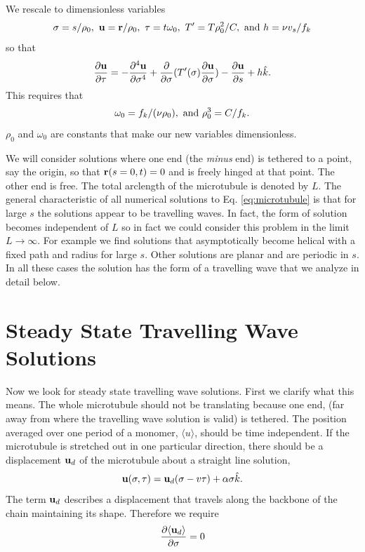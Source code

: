 \documentclass[11pt]{ucthesis}
\def\br{{\bf r}}
\def\bu{{\bf u}}
\begin{document}
{We rescale to dimensionless variables 
\begin{equation}
\label{eq:rescale}
\sigma = s/\rho_0,~ \bu = \br/\rho_0, ~ \tau = t \omega_0,  ~ T' = T \rho_0^2/C, ~{\rm and} ~ h = \nu v_s/f_k 
\end{equation}
so that
\begin{equation}
\label{eq:dimensionless}
\frac{\partial \bu}{\partial \tau} =  - \frac{\partial^4 \bu}{\partial \sigma^4} + \frac{\partial}{\partial \sigma}(T'(\sigma)\frac{\partial \bu}{\partial \sigma}) -
\frac{\partial \bu}{\partial s} + h {\hat k} .
\end{equation}
This requires that 
\begin{equation}
\label{eq:scaling}
\omega_0 = f_k/(\nu \rho_0), ~  {\rm and} ~ \rho_0^3 = C/f_k. 
\end{equation}
$\rho_0$ and $\omega_0$ are constants that make our new variables dimensionless.

We will consider solutions where one end (the {\em minus} end) is tethered to a point, say the origin, so that
$\br(s=0,t) = 0$ and is freely hinged at that point. The other end is free.
The total arclength of the microtubule is denoted by $L$.
The general characteristic of all numerical solutions to Eq. \ref{eq:microtubule} is that
for large $s$ the solutions appear to be travelling waves. In fact, the form of solution
becomes independent of $L$ so in fact we could consider this problem in the limit $L\rightarrow \infty$.
For example we find solutions that asymptotically become helical with a fixed path and radius for
large $s$. Other solutions are planar and are periodic in $s$. In all these cases the solution
has the form of a travelling wave that we analyze in detail below.

\section{Steady State Travelling Wave Solutions}

Now we look for steady state travelling wave solutions. First we clarify what this means.
The whole microtubule should not be translating because one end, (far away from where
the travelling wave solution is valid) is tethered. 
The position averaged over one period of a monomer, $\langle u \rangle$, should be  time independent.
If the microtubule is stretched out
in one particular direction, there should be a displacement $\bu_d$ of the microtubule about a straight
line solution,
\begin{equation}
\label{eq:travelling}
\bu(\sigma, \tau) = \bu_d(\sigma-v\tau) + \alpha \sigma {\hat k}.
\end{equation}
The term $\bu_d$ describes a displacement that travels along the backbone of the chain maintaining its shape.
Therefore we require
\begin{equation}
\label{eq:ud_constraint}
\frac{\partial \langle \bu_d \rangle}{\partial \sigma} = 0
\end{equation}

}
\end{document}

